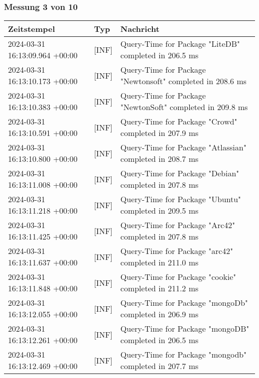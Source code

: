     \subsubsection*{Messung 3 von 10} \label{subsubsec:MySQLOhneIndex3von10}
        {
            {\small
                \begin{tabularx}{\textwidth}{|l|l|X|}
                    \hline
                    \textbf{Zeitstempel} & \textbf{Typ} & \textbf{Nachricht} \\
                    \hline
                    \endhead
                    2024-03-31 16:13:09.964 +00:00 & [INF] & Query-Time for Package "LiteDB" completed in 206.5 ms \\
                    2024-03-31 16:13:10.173 +00:00 & [INF] & Query-Time for Package "Newtonsoft" completed in 208.6 ms \\
                    2024-03-31 16:13:10.383 +00:00 & [INF] & Query-Time for Package "NewtonSoft" completed in 209.8 ms \\
                    2024-03-31 16:13:10.591 +00:00 & [INF] & Query-Time for Package "Crowd" completed in 207.9 ms \\
                    2024-03-31 16:13:10.800 +00:00 & [INF] & Query-Time for Package "Atlassian" completed in 208.7 ms \\
                    2024-03-31 16:13:11.008 +00:00 & [INF] & Query-Time for Package "Debian" completed in 207.8 ms \\
                    2024-03-31 16:13:11.218 +00:00 & [INF] & Query-Time for Package "Ubuntu" completed in 209.5 ms \\
                    2024-03-31 16:13:11.425 +00:00 & [INF] & Query-Time for Package "Arc42" completed in 207.8 ms \\
                    2024-03-31 16:13:11.637 +00:00 & [INF] & Query-Time for Package "arc42" completed in 211.0 ms \\
                    2024-03-31 16:13:11.848 +00:00 & [INF] & Query-Time for Package "cookie" completed in 211.2 ms \\
                    2024-03-31 16:13:12.055 +00:00 & [INF] & Query-Time for Package "mongoDb" completed in 206.9 ms \\
                    2024-03-31 16:13:12.261 +00:00 & [INF] & Query-Time for Package "mongoDB" completed in 206.5 ms \\
                    2024-03-31 16:13:12.469 +00:00 & [INF] & Query-Time for Package "mongodb" completed in 207.7 ms \\

\end{tabularx}}}

